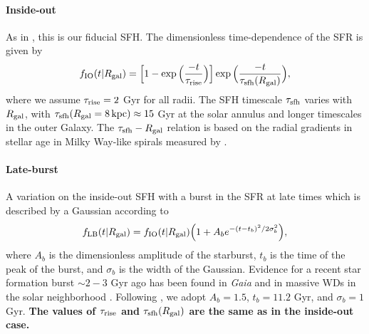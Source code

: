 \documentclass[twocolumn,twocolappendix,linenumbers]{aastex631}
\begin{document}
\paragraph{Inside-out} As in , this is our fiducial SFH. The dimensionless time-dependence of the SFR is given by
\begin{equation}
    f_{\rm IO}(t|R_{\rm gal}) = \Big[1 - \exp\Big(\frac{-t}{\tau_{\rm rise}}\Big)\Big] \exp\Big(\frac{-t}{\tau_{\rm sfh}(R_{\rm gal})}\Big),
    \label{eq:insideout-sfh}
\end{equation}
where we assume $\tau_{\rm rise}=2$ Gyr for all radii. The SFH timescale $\tau_{\rm sfh}$ varies with $R_{\rm gal}$, with $\tau_{\rm sfh}(R_{\rm gal}=8\,\rm{kpc})\approx15$ Gyr at the solar annulus and longer timescales in the outer Galaxy. The $\tau_{\rm sfh} - R_{\rm gal}$ relation is based on the radial gradients in stellar age in Milky Way-like spirals measured by \citet[][see Section 2.5 of  for details]{Sanchez2020-StarFormationTimescales}.

\paragraph{Late-burst} A variation on the inside-out SFH with a burst in the SFR at late times which is described by a Gaussian according to
\begin{equation}
    f_{\rm LB}(t|R_{\rm gal}) = f_{\rm IO}(t|R_{\rm gal}) \Big(1 + A_b e^{-(t-t_b)^2/2\sigma_b^2} \Big),
    \label{eq:lateburst-sfh}
\end{equation}
where $A_b$ is the dimensionless amplitude of the starburst, $t_b$ is the time of the peak of the burst, and $\sigma_b$ is the width of the Gaussian. 
Evidence for a recent star formation burst $\sim 2-3$ Gyr ago has been found in {\it Gaia} \citep{Mor2019-Starburst} and in massive WDs in the solar neighborhood \citep{Isern2019-Starburst}.
Following , we adopt $A_b=1.5$, $t_b=11.2$ Gyr, and $\sigma_b=1$ Gyr. {\bf The values of $\tau_{\rm rise}$ and $\tau_{\rm sfh}(R_{\rm gal})$ are the same as in the inside-out case.}
\end{document}
